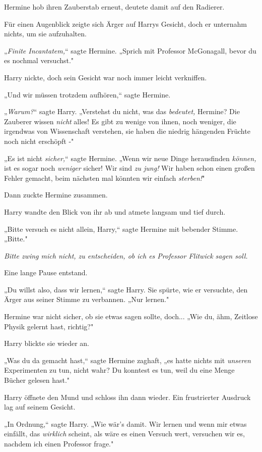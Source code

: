 {Hermine hob ihren Zauberstab erneut, deutete damit auf den Radierer.

Für einen Augenblick zeigte sich Ärger auf Harrys Gesicht, doch er unternahm nichts, um sie aufzuhalten.

„\emph{Finite Incantatem,}“ sagte Hermine. „Sprich mit Professor McGonagall, bevor du es nochmal versuchst."

Harry nickte, doch sein Gesicht war noch immer leicht verkniffen.

„Und wir müssen trotzdem aufhören,“ sagte Hermine.

„\emph{Warum?}“ sagte Harry. „Verstehst du nicht, was das \emph{bedeutet,} Hermine? Die Zauberer wissen \emph{nicht} alles! Es gibt zu wenige von ihnen, noch weniger, die irgendwas von Wissenschaft verstehen, sie haben die niedrig hängenden Früchte noch nicht erschöpft -"

„Es ist nicht \emph{sicher,}“ sagte Hermine. „Wenn wir neue Dinge herausfinden \emph{können,} ist es sogar noch \emph{weniger} sicher! Wir sind \emph{zu jung!} Wir haben schon einen großen Fehler gemacht, beim nächsten mal könnten wir einfach \emph{sterben!}"

Dann zuckte Hermine zusammen.

Harry wandte den Blick von ihr ab und atmete langsam und tief durch.

„Bitte versuch es nicht allein, Harry,“ sagte Hermine mit bebender Stimme. „Bitte."

\emph{Bitte zwing mich nicht, zu entscheiden, ob ich es Professor Flitwick sagen soll.}

Eine lange Pause entstand.

„Du willst also, dass wir lernen,“ sagte Harry. Sie spürte, wie er versuchte, den Ärger aus seiner Stimme zu verbannen. „Nur lernen."

Hermine war nicht sicher, ob sie etwas sagen sollte, doch... „Wie du, ähm, Zeitlose Physik gelernt hast, richtig?"

Harry blickte sie wieder an.

„Was du da gemacht hast,“ sagte Hermine zaghaft, „es hatte nichts mit \emph{unseren} Experimenten zu tun, nicht wahr? Du konntest es tun, weil du eine Menge Bücher gelesen hast."

Harry öffnete den Mund und schloss ihn dann wieder. Ein frustrierter Ausdruck lag auf seinem Gesicht.

„In Ordnung,“ sagte Harry. „Wie wär's damit. Wir lernen und wenn mir etwas einfällt, das \emph{wirklich} scheint, als wäre es einen Versuch wert, versuchen wir es, nachdem ich einen Professor frage."

}
